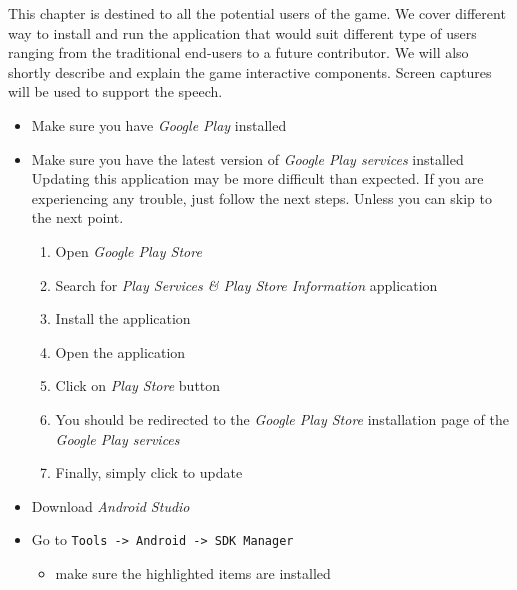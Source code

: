 
This chapter is destined to all the potential users of the game. We cover different way to install and run the application that would suit different type of users ranging from the traditional end-users to a future contributor. We will also shortly describe and explain the game interactive components. Screen captures will be used to support the speech.


\begin{itemize}
	\item Make sure you have \textit{Google Play} installed
	\item Make sure you have the latest version of \textit{Google Play services} installed \newline
  Updating this application may be more difficult than expected. If you are experiencing any trouble, just follow the next steps. Unless you can skip to the next point.
	\begin{enumerate}
    \item Open \textit{Google Play Store}
    \item Search for \textit{Play Services \& Play Store Information} application
    \item Install the application
    \item Open the application
    \item Click on \textit{Play Store} button
    \item You should be redirected to the \textit{Google Play Store} installation page of the \textit{Google Play services}
    \item Finally, simply click to update
	\end{enumerate}
\end{itemize}

\begin{itemize}
	\item Download \textit{Android Studio} %
	\item Go to \texttt{Tools -> Android -> SDK Manager}
	\begin{itemize}
		\item make sure the highlighted items are installed
	\end{itemize}
\end{itemize}

